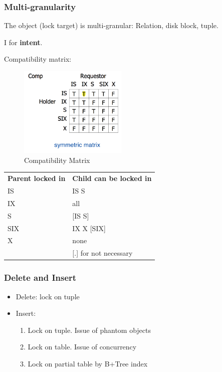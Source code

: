 \documentclass[a4paper]{report}
\begin{document}
\subsubsection{Multi-granularity}
The object (lock target) is multi-granular: Relation, disk block, tuple. 

I for \textbf{intent}.

Compatibility matrix:  
\begin{figure}[H]
    \centerline{\includegraphics[height = 1.7in]{img/lockModes}}
    \caption{Compatibility Matrix}
  \label{fig:compatibilityMatrix}
\end{figure}

\begin{tabular}{ll}
\hline\noalign{\smallskip}
\textbf{Parent locked in} & \textbf{Child can be locked in} \\
\noalign{\smallskip}\hline\noalign{\smallskip}
IS & IS S \\
IX & all \\
S & [IS S] \\
SIX & IX X [SIX] \\
X & none\\
\noalign{\smallskip}\hline\noalign{\smallskip}
\caption{Hierarchy & [.] for not necessary}
\end{tabular}


\subsubsection{Delete and Insert}
\begin{itemize}
\item Delete: lock on tuple
\item Insert: 
\begin{enumerate}
\item Lock on tuple. Issue of phantom objects
\item Lock on table. Issue of concurrency 
\item Lock on partial table by B+Tree index
\end{enumerate}
\end{itemize}
\end{document}

